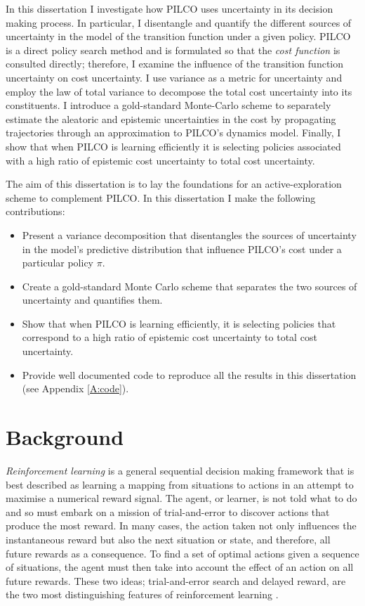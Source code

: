 In this dissertation I investigate how PILCO uses uncertainty in its decision making process. In particular, I disentangle and quantify the different sources of uncertainty in the model of the transition function under a given policy. PILCO is a direct policy search method and is formulated so that the \textit{cost function} is consulted directly; therefore, I examine the influence of the transition function uncertainty on cost uncertainty. I use variance as a metric for uncertainty and employ the law of total variance to decompose the total cost uncertainty into its constituents. I introduce a gold-standard Monte-Carlo scheme to separately estimate the aleatoric and epistemic uncertainties in the cost by propagating trajectories through an approximation to PILCO's dynamics model. Finally, I show that when PILCO is learning efficiently it is selecting policies associated with a high ratio of epistemic cost uncertainty to total cost uncertainty.

The aim of this dissertation is to lay the foundations for an active-exploration scheme to complement PILCO. In this dissertation I make the following contributions:
\begin{itemize}
    \item Present a variance decomposition that disentangles the sources of uncertainty in the model's predictive distribution that influence PILCO's cost under a particular policy $\pi$.
    \item Create a gold-standard Monte Carlo scheme that separates the two sources of uncertainty and quantifies them.
    \item Show that when PILCO is learning efficiently, it is selecting policies that correspond to a high ratio of epistemic cost uncertainty to total cost uncertainty. 
    \item Provide well documented code to reproduce all the results in this dissertation (see Appendix \ref{A:code}).
\end{itemize}

\section{Background} %
\label{S:background}
\textit{Reinforcement learning} is a general sequential decision making framework that is best described as learning a mapping from situations to actions in an attempt to maximise a numerical reward signal. The agent, or learner, is not told what to do and so must embark on a mission of trial-and-error to discover actions that produce the most reward. In many cases, the action taken not only influences the instantaneous reward but also the next situation or state, and therefore, all future rewards as a consequence. To find a set of optimal actions given a sequence of situations, the agent must then take into account the effect of an action on all future rewards. These two ideas; trial-and-error search and delayed reward, are the two most distinguishing features of reinforcement learning \citep{sutton2018reinforcement}.

